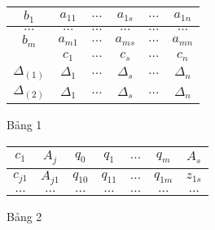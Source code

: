 \documentclass{article}
\begin{document}
\begin{enumerate}
\begin{figure}
                                \caption{Bảng 1}
                                    \begin{center}
                                        \begin{tabular}{|c|c|c|c|c|c|}
                                            \hline
                                            $b_1$ & $a_{11}$ & $\ldots$ & $a_{1s}$ & $\ldots$ & $a_{1n}$ \\
                                            \hline
                                            $\ldots$ & $\ldots$ & $\ldots$ & $\ldots$ & $\ldots$ & $\ldots$ \\
                                            \hline
                                            $b_m$ & $a_{m1}$ & $\ldots$ & $a_{ms}$ & $\ldots$ & $a_{mn}$ \\
                                            \hline
                                            & $c_1$ & $\ldots$ & $c_s$ & $\ldots$ & $c_n$ \\
                                            \hline
                                            $\Delta_{(1)}$ & $\Delta_1$ & $\ldots$ & $\Delta_s$ & $\ldots$ & $\Delta_n$ \\
                                            \hline
                                            $\Delta_{(2)}$ & $\Delta_1$ & $\ldots$ & $\Delta_s$ & $\ldots$ & $\Delta_n$ \\
                                            \hline    
                                        \end{tabular}
                                    \end{center}  
                            \end{figure} 
                            \begin{figure}
                                \caption{Bảng 2}
                                    \begin{center}
                                        \begin{tabular}{|c|c|c|c|c|c|c|}
                                            \hline
                                            $c_1$ & $A_j$ & $q_0$ & $q_1$ & $\ldots$ & $q_m$ & $A_s$ \\
                                            \hline
                                            $c_{j1}$ & $A_{j1}$ & $q_{10}$ & $q_{11}$ & $\ldots$ & $q_{1m}$ & $z_{1s}$ \\
                                            \hline
                                            $\ldots$ & $\ldots$ & $\ldots$ & $\ldots$ & $\ldots$ & $\ldots$ & $\ldots$ \\

\end{tabular}
\end{center}
\end{figure}
\end{enumerate}
\end{document}
